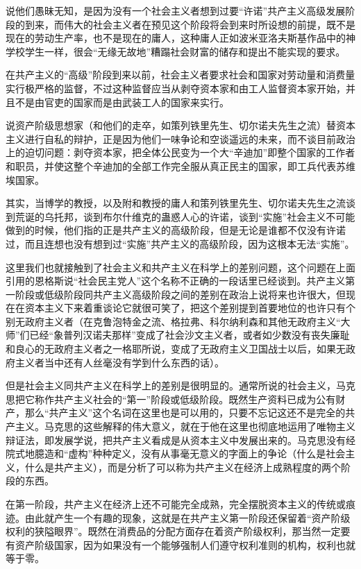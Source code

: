 \documentclass[UTF8, 12pt, a4paper]{ctexrep}
\begin{document}
说他们愚昧无知，是因为没有一个社会主义者想到过要“许诺”共产主义高级发展阶段的到来，而伟大的社会主义者在预见这个阶段将会到来时所设想的前提，既不是现在的劳动生产率，也不是现在的庸人，这种庸人正如波米亚洛夫斯基作品中的神学校学生一样，很会“无缘无故地”糟蹋社会财富的储存和提出不能实现的要求。

在共产主义的“高级”阶段到来以前，社会主义者要求社会和国家对劳动量和消费量实行极严格的监督，不过这种监督应当从剥夺资本家和由工人监督资本家开始，并且不是由官吏的国家而是由武装工人的国家来实行。

说资产阶级思想家（和他们的走卒，如策列铁里先生、切尔诺夫先生之流）替资本主义进行自私的辩护，正是因为他们一味争论和空谈遥远的未来，而不谈目前政治上的迫切问题：剥夺资本家，把全体公民变为一个大“辛迪加”即整个国家的工作者和职员，并使这整个辛迪加的全部工作完全服从真正民主的国家，即工兵代表苏维埃国家。

其实，当博学的教授，以及附和教授的庸人和策列铁里先生、切尔诺夫先生之流谈到荒诞的乌托邦，谈到布尔什维克的蛊惑人心的许诺，谈到“实施”社会主义不可能做到的时候，他们指的正是共产主义的高级阶段，但是无论是谁都不仅没有许诺过，而且连想也没有想到过“实施”共产主义的高级阶段，因为这根本无法“实施”。

这里我们也就接触到了社会主义和共产主义在科学上的差别问题，这个问题在上面引用的恩格斯说“社会民主党人”这个名称不正确的一段话里已经谈到。共产主义第一阶段或低级阶段同共产主义高级阶段之间的差别在政治上说将来也许很大，但现在在资本主义下来着重谈论它就很可笑了，把这个差别提到首要地位的也许只有个别无政府主义者（在克鲁泡特金之流、格拉弗、科尔纳利森和其他无政府主义“大师”们已经“象普列汉诺夫那样”变成了社会沙文主义者，或者如少数没有丧失廉耻和良心的无政府主义者之一格耶所说，变成了无政府主义卫国战士以后，如果无政府主义者当中还有人丝毫没有学到什么东西的话）。

但是社会主义同共产主义在科学上的差别是很明显的。通常所说的社会主义，马克思把它称作共产主义社会的“第一”阶段或低级阶段。既然生产资料已成为公有财产，那么“共产主义”这个名词在这里也是可以用的，只要不忘记这还不是完全的共产主义。马克思的这些解释的伟大意义，就在于他在这里也彻底地运用了唯物主义辩证法，即发展学说，把共产主义看成是从资本主义中发展出来的。马克思没有经院式地臆造和“虚构”种种定义，没有从事毫无意义的字面上的争论（什么是社会主义，什么是共产主义），而是分析了可以称为共产主义在经济上成熟程度的两个阶段的东西。

在第一阶段，共产主义在经济上还不可能完全成熟，完全摆脱资本主义的传统或痕迹。由此就产生一个有趣的现象，这就是在共产主义第一阶段还保留着“资产阶级权利的狭隘眼界”。既然在消费品的分配方面存在着资产阶级权利，那当然一定要有资产阶级国家，因为如果没有一个能够强制人们遵守权利准则的机构，权利也就等于零。
\end{document}
